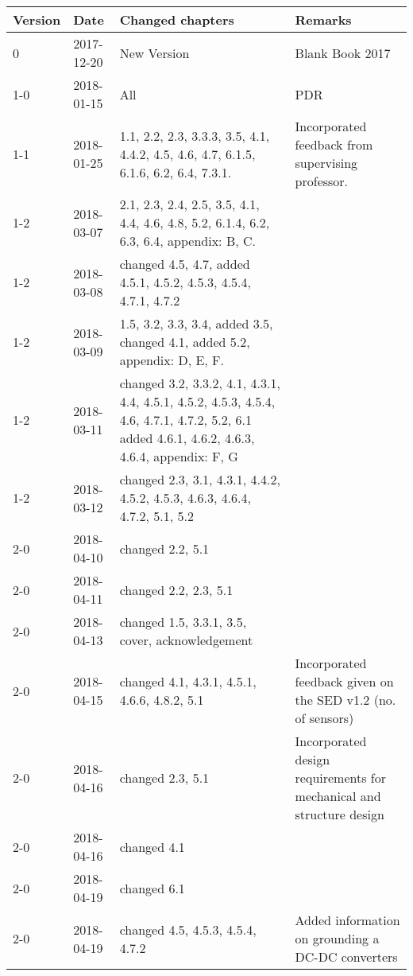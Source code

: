 \begin{longtable}{|p{}| p{} |p{} |p{}|}\hline
    \centering
    \textbf{Version}    & \textbf{Date}     & \textbf{Changed chapters} & \textbf{Remarks} \\\hline
    0       &   2017-12-20   & New Version   & Blank Book 2017  \\
    1-0     &   2018-01-15   & All           & PDR \\ 
    1-1     &   2018-01-25   & 1.1, 2.2, 2.3, 3.3.3, 3.5, 4.1, 4.4.2, 4.5, 4.6, 4.7, 6.1.5, 6.1.6, 6.2, 6.4, 7.3.1. & Incorporated feedback from supervising professor.\\ 
    1-2     &   2018-03-07   & 2.1, 2.3, 2.4, 2.5, 3.5, 4.1, 4.4, 4.6, 4.8, 5.2, 6.1.4, 6.2, 6.3, 6.4, appendix: B, C.     &    \\\hline 
    1-2     &   2018-03-08   & changed 4.5, 4.7, added 4.5.1, 4.5.2, 4.5.3, 4.5.4, 4.7.1, 4.7.2     &    \\\hline
    1-2     &   2018-03-09   & 1.5, 3.2, 3.3, 3.4, added 3.5, changed 4.1, added 5.2,  appendix: D, E, F.     & \\\hline 
    1-2     &   2018-03-11   & changed 3.2, 3.3.2, 4.1, 4.3.1, 4.4, 4.5.1, 4.5.2, 4.5.3, 4.5.4, 4.6, 4.7.1, 4.7.2, 5.2, 6.1 added 4.6.1, 4.6.2, 4.6.3, 4.6.4, appendix: F, G &    \\\hline 
    1-2     &   2018-03-12   & changed 2.3, 3.1, 4.3.1, 4.4.2, 4.5.2, 4.5.3, 4.6.3, 4.6.4, 4.7.2, 5.1, 5.2 & \\\hline 
    2-0     &   2018-04-10   & changed 2.2, 5.1 & \\\hline 
    2-0     &   2018-04-11   & changed 2.2, 2.3, 5.1 & \\\hline 
    2-0     &   2018-04-13   & changed 1.5, 3.3.1, 3.5, cover, acknowledgement &\\\hline 
    2-0     &   2018-04-15   & changed 4.1, 4.3.1, 4.5.1, 4.6.6, 4.8.2, 5.1 & Incorporated feedback given on the SED v1.2 (no. of sensors)\\\hline
    2-0     &   2018-04-16   & changed 2.3, 5.1 & Incorporated design requirements for mechanical and structure design\\\hline 
    2-0     &   2018-04-16   & changed 4.1 & \\\hline
    2-0     &   2018-04-19   & changed 6.1 & \\\hline
    2-0     &   2018-04-19   & changed 4.5, 4.5.3, 4.5.4, 4.7.2 & Added information on grounding a DC-DC converters \\\hline

\end{longtable}
